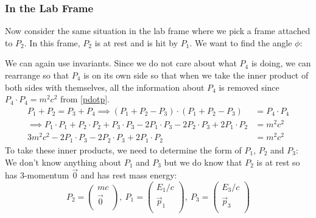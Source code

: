 \documentclass[../main.tex]{subfiles}
\begin{document}
\subsubsection{In the Lab Frame}
Now consider the same situation in the lab frame where we pick a frame attached to $P_2$.
In this frame, $P_2$ is at rest and is hit by $P_1$.
We want to find the angle $\phi$:
\begin{center}
\end{center}
We can again use invariants.
Since we do not care about what $P_4$ is doing, we can rearrange so that $P_4$ is on its own side so that when we take the inner product of both sides with themselves, all the information about $P_4$ is removed since $P_4 \cdot P_4 = m^2 c^2$ from \cref{pdotp}.
\begin{align}
  P_1 + P_2 = P_3 + P_4 \implies (P_1 + P_2 - P_3) \cdot (P_1 + P_2 - P_3) &= P_4 \cdot P_4 \nonumber \\
  \implies P_1 \cdot P_1 + P_2 \cdot P_2 + P_3 \cdot P_3 - 2P_1 \cdot P_3 - 2 P_2 \cdot P_3 + 2 P_1 \cdot P_2 &= m^2 c^2 \nonumber \\
  3m^2 c^2 - 2P_1 \cdot P_3 - 2 P_2 \cdot P_3 + 2 P_1 \cdot P_2 &= m^2 c^2 \label{eqnCollisionLab} \tag{$\star$}
\end{align}
To take these inner products, we need to determine the form of $P_1$, $P_2$ and $P_3$:
We don't know anything about $P_1$ and $P_3$ but we do know that $P_2$ is at rest so has 3-momentum $\vec{0}$ and has rest mass energy:
\[
  P_2 = \begin{pmatrix}
  mc \\
  \vec{0} \\
  \end{pmatrix},\ P_1 = \begin{pmatrix}
  E_1/c \\
  \vec{p}_1 \\
  \end{pmatrix},\ P_3 = \begin{pmatrix}
  E_3/c \\
  \vec{p}_3 \\
  \end{pmatrix}
\]
\end{document}
